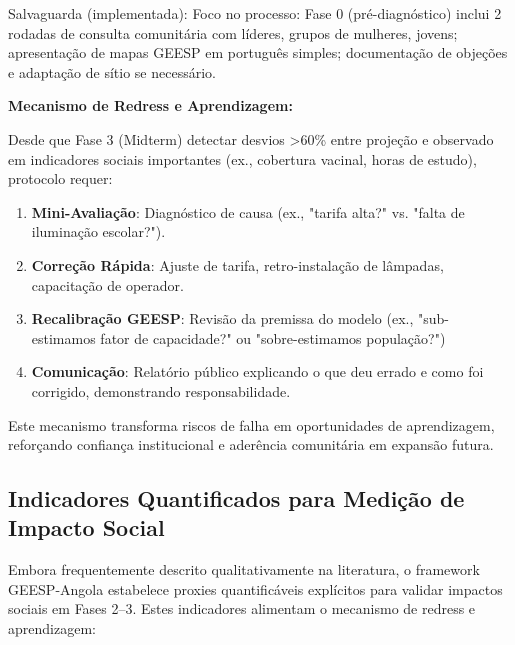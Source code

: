 \documentclass[12pt, a4paper]{article}
\begin{document}
\begin{itemize}
\begin{enumerate}
  Salvaguarda (implementada): Foco no processo: Fase 0 (pré-diagnóstico) inclui 2 rodadas de consulta comunitária com líderes, grupos de mulheres, jovens; apresentação de mapas GEESP em português simples; documentação de objeções e adaptação de sítio se necessário.
\end{enumerate}

\textbf{Mecanismo de Redress e Aprendizagem:}

Desde que Fase 3 (Midterm) detectar desvios >60\% entre projeção e observado em indicadores sociais importantes (ex., cobertura vacinal, horas de estudo), protocolo requer:

\begin{enumerate}
\item \textbf{Mini-Avaliação}: Diagnóstico de causa (ex., "tarifa alta?" vs. "falta de iluminação escolar?").
\item \textbf{Correção Rápida}: Ajuste de tarifa, retro-instalação de lâmpadas, capacitação de operador.
\item \textbf{Recalibração GEESP}: Revisão da premissa do modelo (ex., "sub-estimamos fator de capacidade?" ou "sobre-estimamos população?")
\item \textbf{Comunicação}: Relatório público explicando o que deu errado e como foi corrigido, demonstrando responsabilidade.
\end{enumerate}

Este mecanismo transforma riscos de falha em oportunidades de aprendizagem, reforçando confiança institucional e aderência comunitária em expansão futura.

\subsection{Indicadores Quantificados para Medição de Impacto Social}

Embora frequentemente descrito qualitativamente na literatura, o framework GEESP-Angola estabelece proxies quantificáveis explícitos para validar impactos sociais em Fases 2--3. Estes indicadores alimentam o mecanismo de redress e aprendizagem:


\end{itemize}
\end{document}
